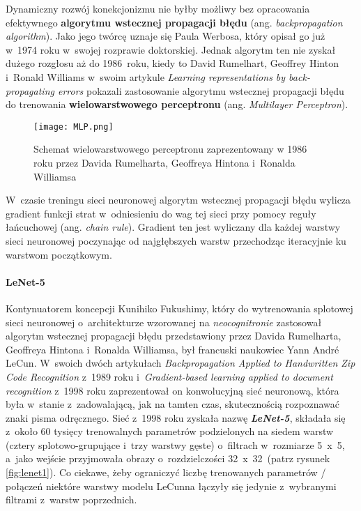 Dynamiczny rozwój konekcjonizmu nie byłby możliwy bez opracowania efektywnego \textbf{algorytmu wstecznej propagacji błędu} (ang. \emph{backpropagation algorithm}). Jako jego twórcę uznaje się Paula Werbosa, który opisał go już w~1974 roku w~swojej rozprawie doktorskiej. Jednak algorytm ten nie zyskał dużego rozgłosu aż do 1986~roku, kiedy to David Rumelhart, Geoffrey Hinton i~Ronald Williams w~swoim artykule \emph{Learning representations by back-propagating errors} \cite{rumelhart} pokazali zastosowanie algorytmu wstecznej propagacji błędu do trenowania \textbf{wielowarstwowego perceptronu} (ang. \emph{Multilayer Perceptron}).

\begin{figure}[!h]
    \centering \texttt{[image: MLP.png]}
    \captionsetup{format=hang}
      \caption{Schemat wielowarstwowego perceptronu zaprezentowany w 1986 roku przez Davida Rumelharta, Geoffreya Hintona i~Ronalda Williamsa \cite{rumelhart}}
    \label{fig:mlp1}
\end{figure}

 W~czasie treningu sieci neuronowej algorytm wstecznej propagacji błędu wylicza gradient funkcji strat w~odniesieniu do wag tej sieci przy pomocy reguły łańcuchowej (ang. \emph{chain rule}). Gradient ten jest wyliczany dla każdej warstwy sieci neuronowej poczynając od najgłębszych warstw przechodząc iteracyjnie ku warstwom początkowym. 


\paragraph*{LeNet-5}

Kontynuatorem koncepcji Kunihiko Fukushimy, który do wytrenowania splotowej sieci neuronowej o~architekturze wzorowanej na \emph{neocognitronie} zastosował algorytm wstecznej propagacji błędu przedstawiony przez Davida Rumelharta, Geoffreya Hintona i~Ronalda Williamsa, był francuski naukowiec Yann André LeCun. W~swoich dwóch artykułach \emph{Backpropagation Applied to Handwritten Zip Code Recognition} z~1989 roku \cite{lecun1} i~\emph{Gradient-based learning applied to document recognition} z~1998 roku \cite{lecun2} zaprezentował on konwolucyjną sieć neuronową, która była w~stanie z~zadowalającą, jak na tamten czas, skutecznością rozpoznawać znaki pisma odręcznego. Sieć z~1998 roku zyskała nazwę \textbf{\emph{LeNet-5}}, składała się z~około 60 tysięcy trenowalnych parametrów podzielonych na siedem warstw (cztery splotowo-grupujące i~trzy warstwy gęste) o~filtrach w~rozmiarze 5~x~5, a~jako wejście przyjmowała obrazy o~rozdzielczości 32~x~32~(patrz rysunek \ref{fig:lenet1}). Co ciekawe, żeby ograniczyć liczbę trenowanych parametrów / połączeń niektóre warstwy modelu LeCunna łączyły się jedynie z~wybranymi filtrami z~warstw poprzednich. 

